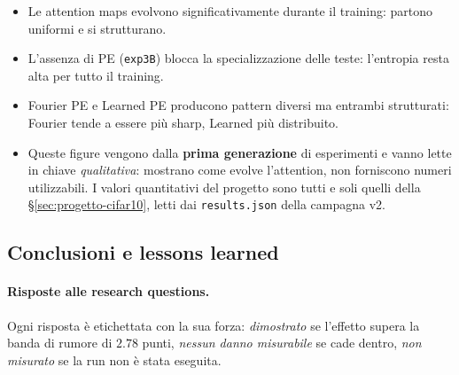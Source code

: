 \documentclass[
  11pt,
]{article}
\begin{document}
\begin{notabox}[title={\textbf{Conclusioni dall'analisi attention}}]
\begin{itemize}
\item Le attention maps evolvono significativamente durante il training: partono uniformi e si strutturano.
\item L'assenza di PE (\texttt{exp3B}) blocca la specializzazione delle teste: l'entropia resta alta per tutto il training.
\item Fourier PE e Learned PE producono pattern diversi ma entrambi strutturati: Fourier tende a essere più sharp, Learned più distribuito.
\item Queste figure vengono dalla \textbf{prima generazione} di esperimenti e vanno lette in chiave \emph{qualitativa}: mostrano come evolve l'attention, non forniscono numeri utilizzabili. I valori quantitativi del progetto sono tutti e soli quelli della §\ref{sec:progetto-cifar10}, letti dai \texttt{results.json} della campagna v2.
\end{itemize}
\end{notabox}

\subsection{Conclusioni e lessons learned}
\label{sec:progetto-conclusioni}

\paragraph{Risposte alle research questions.} Ogni risposta è etichettata con la sua forza: \emph{dimostrato} se l'effetto supera la banda di rumore di $2.78$ punti, \emph{nessun danno misurabile} se cade dentro, \emph{non misurato} se la run non è stata eseguita.
\end{document}
